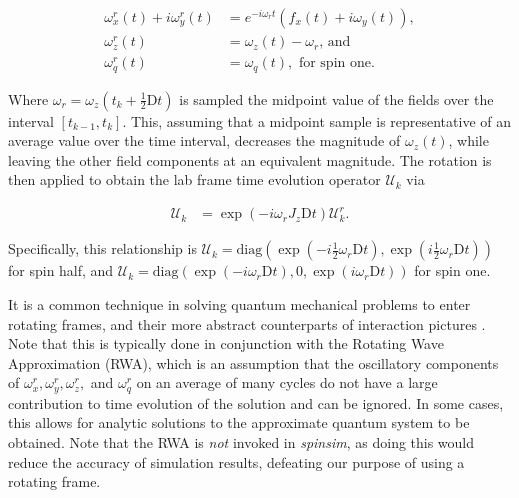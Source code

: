 \documentclass{jors}
\begin{document}
		\begin{align}
			\omega^r_x(t) + i\omega^r_y(t) &= e^{-i \omega_r t}(f_x(t) + i\omega_y(t)),\\
			\omega^r_z(t) &= \omega_z(t) - \omega_r\textrm{, and}\\
			\omega^r_q(t) &= \omega_q(t), \textrm{ for spin one.}
		\end{align}
		
		Where \(\omega_r = \omega_z(t_k + \frac12\mathrm{D}t)\) is sampled the midpoint value of the fields over the interval \([t_{k - 1}, t_k]\).
		This, assuming that a midpoint sample is representative of an average value over the time interval, decreases the magnitude of \(\omega_z(t)\), while leaving the other field components at an equivalent magnitude.
		The rotation is then applied to obtain the lab frame time evolution operator \(\mathcal{U}_k\) via
		
		\begin{align}
			\mathcal{U}_k &= \exp(-i \omega_r J_z \mathrm{D}t) \mathcal{U}^r_k.
		\end{align}

		Specifically, this relationship is \(\mathcal{U}_k = \mathrm{diag}\left(\exp\left(-i \frac12 \omega_r \mathrm{D}t\right), \exp\left(i \frac12 \omega_r \mathrm{D}t\right)\right)\) for spin half, and \(\mathcal{U}_k = \mathrm{diag}(\exp(-i \omega_r \mathrm{D}t), 0, \exp(i \omega_r \mathrm{D}t))\) for spin one.


		It is a common technique in solving quantum mechanical problems to enter rotating frames, and their more abstract counterparts of interaction pictures \cite{j_j_sakurai_jun_john_modern_1994}.
		Note that this is typically done in conjunction with the Rotating Wave Approximation (RWA), which is an assumption that the oscillatory components of \(\omega^r_x, \omega^r_y, \omega^r_z,\) and \(\omega^r_q\) on an average of many cycles do not have a large contribution to time evolution of the solution and can be ignored.
		In some cases, this allows for analytic solutions to the approximate quantum system to be obtained.
		Note that the RWA is \emph{not} invoked in \emph{spinsim}, as doing this would reduce the accuracy of simulation results, defeating our purpose of using a rotating frame.
		
\end{document}
